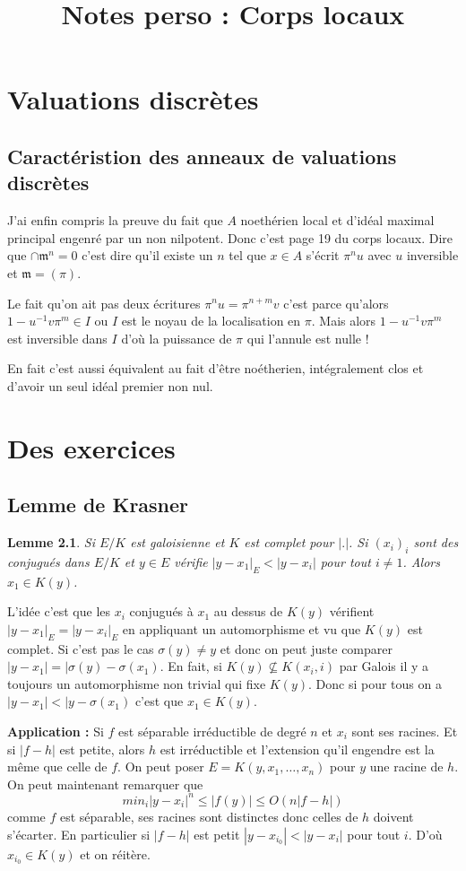 \documentclass[a4paper,12pt]{book}
\title{Notes perso : Corps locaux}
\date{}
\newcommand{\m}{\mathfrak{m}}
\theoremstyle{plain}
\newtheorem{lem}[subsection]{Lemme}
\theoremstyle{definition}
\theoremstyle{remark}
\begin{document}
\maketitle
\tableofcontents

\chapter{Valuations discrètes}
\section{Caractéristion des anneaux de valuations discrètes}
J'ai enfin compris la preuve du fait que $A$ noethérien local et d'idéal 
maximal principal engenré par un non nilpotent. Donc c'est page 19
du corps locaux. Dire que $\cap \m^n=0$ c'est dire qu'il existe un 
$n$ tel que $x\in A$ s'écrit $\pi^n u$ avec $u$ inversible et $\m=(\pi)$.

Le fait qu'on ait pas deux écritures $\pi^n u=\pi^{n+m} v$ c'est parce
qu'alors $1-u^{-1}v\pi^m\in I$ ou $I$ est le noyau de la localisation
en $\pi$. Mais alors $1-u^{-1}v\pi^m$ est inversible dans $I$ d'où
la puissance de $\pi$ qui l'annule est nulle !


En fait c'est aussi équivalent au fait d'être noétherien, intégralement
clos et d'avoir un seul idéal premier non nul.

\chapter{Des exercices}
\section{Lemme de Krasner}
\begin{lem}
  Si $E/K$ est galoisienne et $K$ est complet pour $|.|$. Si 
  $(x_i)_i$ sont des conjugués dans $E/K$ et $y\in E$ vérifie
  $|y-x_1|_E<|y-x_i|$ pour tout $i\ne 1$. Alors $x_1\in K(y)$.
\end{lem}
L'idée c'est que les $x_i$ conjugués à $x_1$ au dessus de $K(y)$
vérifient $|y-x_1|_E=|y-x_i|_E$ en appliquant un automorphisme 
et vu que $K(y)$ est complet. Si c'est pas le cas 
$\sigma(y)\ne y$ et donc on peut juste comparer 
$|y-x_1|=|\sigma(y)-\sigma(x_1)$. En fait, si $K(y)\nsubseteq K(x_i,i)$
par Galois il y a toujours un automorphisme non trivial qui fixe 
$K(y)$. Donc si pour tous on a $|y-x_1|<|y-\sigma(x_1)$ c'est que
$x_1\in K(y)$.

\textbf{Application :}
Si $f$ est séparable irréductible de degré $n$ et $x_i$ sont 
ses racines. Et si $|f-h|$ est petite, alors $h$ est irréductible
et l'extension qu'il engendre est la même que celle de $f$.
On peut poser $E=K(y,x_1,\ldots,x_n)$ pour $y$ une racine 
de $h$. On peut maintenant remarquer que 
\[min_i|y-x_i|^n\leq |f(y)|\leq O(n|f-h|)\] 
comme $f$ est séparable, ses racines sont distinctes donc
celles de $h$ doivent s'écarter. En particulier si $|f-h|$ 
est petit $|y-x_{i_0}|<|y-x_i|$ pour tout $i$. D'où 
$x_{i_0}\in K(y)$ et on réitère.



\printbibliography
\end{document}
